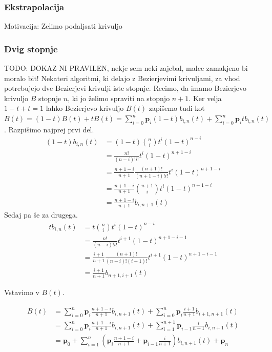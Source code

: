 \documentclass[isrm2, tisk]{fmfdelo}
\newcommand{\lilb}[2]{b_{#1,#2}(t)}
\begin{document}
    \subsubsection{Ekstrapolacija}
    Motivacija: Zelimo podaljsati krivuljo

    \subsubsection{Dvig stopnje}
    TODO: DOKAZ NI PRAVILEN, nekje sem neki zajebal, malce zamakjeno bi moralo bit!
    Nekateri algoritmi, ki delajo z Bezierjevimi krivuljami, za vhod potrebujejo dve Bezierjevi krivulji iste stopnje.
    Recimo, da imamo Bezierjevo krivuljo $B$ stopnje $n$, ki jo želimo spraviti na stopnjo $n+1$.
    Ker velja $1-t+t=1$ lahko Bezierjevo krivuljo $B(t)$ zapišemo tudi kot $B(t) = (1-t)B(t)+tB(t) = \sum_{i=0}^{n}\mathbf{p}_{i}(1-t)\lilb{i}{n} +\sum_{i=0}^{n}\mathbf{p}_{i}t\lilb{i}{n} $.
    Razpišimo najprej prvi del.
    \begin{align*}
    (1-t)
        \lilb{i}{n} &= (1-t)\binom{n}{i}t^i(1-t)^{n-i} \\
        &= \frac{n!}{(n-i)!i!}t^i(1-t)^{n+1-i} \\
        &=\frac{n+1-i}{n+1}\frac{(n+1)!}{(n+1-i)!i!}t^i(1-t)^{n+1-i}\\
        &=\frac{n+1-i}{n+1} \binom{n+1}{i}t^i(1-t)^{n+1-i} \\
        &=\frac{n+1-i}{n+1}\lilb{i}{n+1}
    \end{align*}
    Sedaj pa še za drugega.
    \begin{align*}
        t\lilb{i}{n} &= t\binom{n}{i}t^i(1-t)^{n-i} \\
        &= \frac{n!}{(n-i)!i!}t^{i+1}(1-t)^{n+1-i-1} \\
        &= \frac{i+1}{n+1}\frac{(n+1)!}{(n-i)!(i+1)!}t^{i+1}(1-t)^{n+1-i-1} \\
        &= \frac{i+1}{n+1}\lilb{n+1}{i+1}
    \end{align*}

    Vstavimo v $B(t)$.

    \begin{align*}
        B(t) &= \sum_{i=0}^{n}\mathbf{p}_{i}\frac{n+1-i}{n+1}\lilb{i}{n+1} +\sum_{i=0}^{n}\mathbf{p}_{i}\frac{i+1}{n+1}\lilb{i+1}{n+1}\\
        &= \sum_{i=0}^{n}\mathbf{p}_{i}\frac{n+1-i}{n+1}\lilb{i}{n+1} +\sum_{i=1}^{n+1}\mathbf{p}_{i-1}\frac{i}{n+1}\lilb{i}{n+1} \\
        &=\mathbf{p}_{0} + \sum_{i=1}^{n}\left(\mathbf{p}_{i}\frac{n+1-i}{n+1} + \mathbf{p}_{i-1}\frac{i}{n+1}\right)\lilb{i}{n+1}+\mathbf{p}_{n}
    \end{align*}
\end{document}
